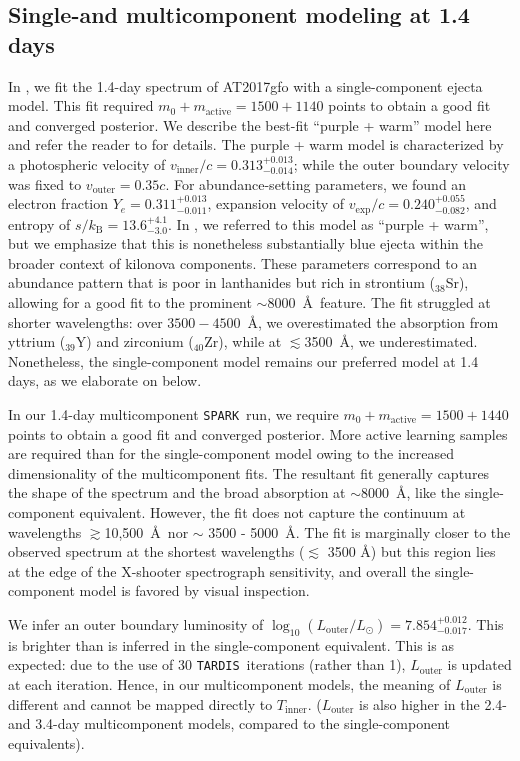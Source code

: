 \documentclass[twocolumn,twocolappendix]{aastex63}
\def\SPARK{\texttt{SPARK}}
\def\TARDIS{\texttt{TARDIS}}
\def\V23{\citetalias{vieira23}}
\begin{document}
{{{{{{%
\subsection{Single-and multicomponent modeling at 1.4 days}\label{ssc:1.4}

In \V23, we fit the 1.4-day spectrum of AT2017gfo with a single-component ejecta model. This fit required $m_0 + m_{\mathrm{active}} = 1500 + 1140$ points to obtain a good fit and converged posterior. We describe the best-fit ``purple + warm'' model here and refer the reader to \V23 for details. The purple + warm model is characterized by a photospheric velocity of $v_{\mathrm{inner}}/c = 0.313^{+0.013}_{-0.014}$; while the outer boundary velocity was fixed to $v_{\mathrm{outer}} = 0.35c$. For abundance-setting parameters, we found an electron fraction $Y_e = 0.311^{+0.013}_{-0.011}$, expansion velocity of $v_{\mathrm{exp}}/c = 0.240^{+0.055}_{-0.082}$, and entropy of $s / k_{\mathrm{B}} = 13.6^{+4.1}_{-3.0}$. In \V23, we referred to this model as ``purple + warm'', but we emphasize that this is nonetheless substantially blue ejecta within the broader context of kilonova components. These parameters correspond to an abundance pattern that is poor in lanthanides but rich in strontium (${}_{38}$Sr), allowing for a good fit to the prominent $\sim$8000~\AA~feature. The fit struggled at shorter wavelengths: over $3500-4500$~\AA, we overestimated the absorption from yttrium (${}_{39}$Y) and zirconium (${}_{40}$Zr), while at $\lesssim$3500~\AA, we underestimated. Nonetheless, the single-component model remains our preferred model at 1.4 days, as we elaborate on below.

In our 1.4-day multicomponent \SPARK~run, we require $m_0 + m_{\mathrm{active}} = 1500 + 1440$ points to obtain a good fit and converged posterior. More active learning samples are required than for the single-component model owing to the increased dimensionality of the multicomponent fits. The resultant fit generally captures the shape of the spectrum and the broad absorption at $\sim$8000~\AA, like the single-component equivalent. However, the fit does not capture the continuum at wavelengths $\gtrsim$10,500~\AA~nor $\sim$ 3500 - 5000~\AA. The fit is marginally closer to the observed spectrum at the shortest wavelengths ($\lesssim$ 3500 \AA) but this region lies at the edge of the X-shooter spectrograph sensitivity, and overall the single-component model is favored by visual inspection. 

We infer an outer boundary luminosity of $\log_{10} (L_{\mathrm{outer}}/L_{\odot}) = 7.854^{+0.012}_{-0.017}$. This is brighter than is inferred in the single-component equivalent. This is as expected: due to the use of 30 \TARDIS~iterations (rather than 1), $L_{\mathrm{outer}}$ is updated at each iteration. Hence, in our multicomponent models, the meaning of $L_{\mathrm{outer}}$ is different and cannot be mapped directly to $T_{\mathrm{inner}}$. ($L_{\mathrm{outer}}$ is also higher in the 2.4- and 3.4-day multicomponent models, compared to the single-component equivalents).

}}}}}}
\end{document}
